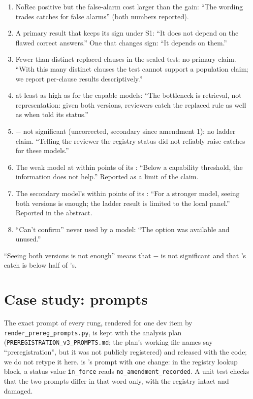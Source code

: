 \begin{enumerate}
  \item NoRec positive but the false-alarm cost larger than the gain: ``The wording trades catches for false alarms''
  (both numbers reported).
  \item A primary result that keeps its sign under S1: ``It does not depend on the flawed correct answers.'' One that
  changes sign: ``It depends on them.''
  \item Fewer than \MinClauses{} distinct replaced clauses in the sealed test: no primary claim. ``With
  this many distinct clauses the test cannot support a population claim; we report per-clause results
  descriptively.''
  \item {} at least as high as  for the capable models: ``The bottleneck is retrieval,
  not representation: given both versions, reviewers catch the replaced rule as well as when told its
  status.''
  \item {}$-$ not significant (uncorrected, secondary since amendment 1): no ladder claim. ``Telling the reviewer the
  registry status did not reliably raise catches for these models.''
  \item The weak model at  within \InterpPoints{} points of its : ``Below a capability
  threshold, the information does not help.'' Reported as a limit of the claim.
  \item The secondary model's  within \InterpPoints{} points of its : ``For a stronger
  model, seeing both versions is enough; the ladder result is limited to the local panel.'' Reported in
  the abstract.
  \item ``Can't confirm'' never used by a model: ``The option was available and unused.''
\end{enumerate}
``Seeing both versions is not enough'' means that $-$ is not significant and that
's catch is below half of 's.

\section{Case study: prompts}
\label{app:prompts}
The exact prompt of every rung, rendered for one dev item by \texttt{render\_prereg\_prompts.py}, is kept with
the analysis plan (\texttt{PREREGISTRATION\_v3\_PROMPTS.md}; the plan's working file names say ``preregistration'',
but it was not publicly registered) and released with the code; we do not retype it here.
 is 's prompt with one change: in the registry lookup block, a status value
\texttt{in\_force} reads \texttt{no\_amendment\_recorded}. A unit test checks that the two prompts differ in that word
only, with the registry intact and damaged.

